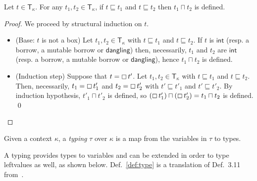 \begin{lemma}\label{lemma:technical-type}
  Let $t\in\mathsf{T}_\kappa$. For any $t_1,t_2\in\mathsf{T}_\kappa$,
  if $t\sqsubseteq t_1$ and $t\sqsubseteq t_2$ then $t_1\sqcap t_2$ is defined.
\end{lemma}
\begin{proof}
  We proceed by structural induction on $t$.
  \begin{itemize}
    \item (Base: $t$ is not a box)
    Let $t_1,t_2\in\mathsf{T}_\kappa$ with $t\sqsubseteq t_1$ and $t\sqsubseteq t_2$.
    If $t$ is $\mathsf{int}$ (resp. a borrow, a mutable borrow or $\mathsf{dangling}$)
    then, necessarily, $t_1$ and $t_2$ are $\mathsf{int}$ (resp. a borrow,
    a mutable borrow or $\mathsf{dangling}$), hence $t_1\sqcap t_2$ is defined.
    \item (Induction step) Suppose that $t = \boxempty\,{t'}$.
    Let $t_1,t_2\in\mathsf{T}_\kappa$ with $t\sqsubseteq t_1$ and $t\sqsubseteq t_2$.
    Then, necessarily, $t_1 = \boxempty\,{t'_1}$ and $t_2 = \boxempty\,{t'_2}$
    with $t'\sqsubseteq t'_1$ and $t'\sqsubseteq t'_2$. By induction
    hypothesis, $t'_1\sqcap t'_2$ is defined, so
    $(\boxempty\,{t'_1}) \sqcap (\boxempty\,{t'_2}) = t_1 \sqcap t_2$ is defined.
    \qed
  \end{itemize}
\end{proof}

\begin{definition}[Typing]\label{def:typing}
  Given a context $\kappa$, a \emph{typing} $\tau$ over $\kappa$ is
  a map from the variables in $\tau$ to types.
\end{definition}

A typing provides types to variables and can be extended in order to type
leftvalues as well, as shown below. Def.~\ref{def:type} is a translation of
Def.~3.11 from~\cite{Pearce21}.

